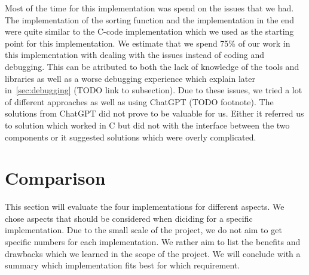 \documentclass[conference]{IEEEtran}
\begin{document}
Most of the time for this implementation was spend on the issues that we had. The implementation of the sorting function and the implementation in the end were quite similar to the C-code implementation which we used as the starting point for this implementation. We estimate that we spend 75\% of our work in this implementation with dealing with the issues instead of coding and debugging. This can be atributed to both the lack of knowledge of the tools and libraries as well as a worse debugging experience which explain later in~\ref{sec:debugging} (TODO link to subsection). Due to these issues, we tried a lot of different approaches as well as using ChatGPT (TODO footnote). The solutions from ChatGPT did not prove to be valuable for us. Either it referred us to solution which worked in C but did not with the interface between the two components or it suggested solutions which were overly complicated.

\section{Comparison}
This section will evaluate the four implementations for different aspects. We chose aspects that should be considered when diciding for a specific implementation. Due to the small scale of the project, we do not aim to get specific numbers for each implementation. We rather aim to list the benefits and drawbacks which we learned in the scope of the project. We will conclude with a summary which implementation fits best for which requirement.
\end{document}
